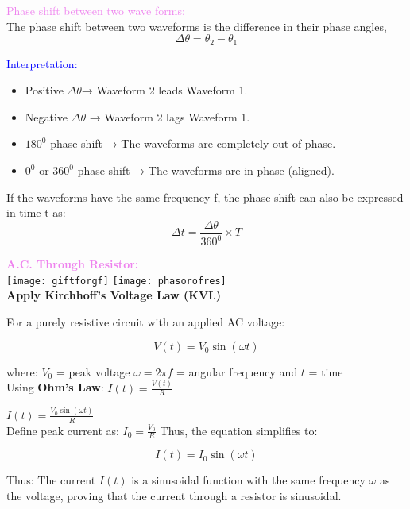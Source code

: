 \documentclass{beamer}
\begin{document}
\begin{frame}
\textcolor{violet}{Phase shift between two wave forms:}\\
The phase shift between two waveforms is the difference in their phase angles, 
\[
\Delta\theta=\theta_2-\theta_1
\]

\textcolor{blue}{Interpretation:}
\begin{itemize}
\item Positive $\Delta\theta$→ Waveform 2 leads Waveform 1.
\item Negative $\Delta\theta$ → Waveform 2 lags Waveform 1.
\item $180^0$ phase shift → The waveforms are completely out of phase.
\item $0^0$ or $360^0$ phase shift → The waveforms are in phase (aligned).
\end{itemize} 
If the waveforms have the same frequency f, the phase shift can also be expressed in time t as:
\[
\Delta t=\frac{\Delta\theta}{360^0}\times T
\]

\end{frame}

\begin{frame}
\textcolor{violet}{\textbf{A.C. Through Resistor:}}\\
\texttt{[image: giftforgf]}
\texttt{[image: phasorofres]}\\
\textbf{Apply Kirchhoff’s Voltage Law (KVL)}


For a purely resistive circuit with an applied AC voltage:

\[
V(t) = V_0 \sin(\omega t)
\]

where: \( V_0 \) = peak voltage  \( \omega = 2\pi f \) = angular frequency  
    and \( t \) = time  \\

Using \textbf{Ohm’s Law}: $I(t) = \frac{V(t)}{R}$

\hspace{6cm} $I(t) = \frac{V_0\sin(\omega t)}{R}$\\
Define peak current as:  $I_0 = \frac{V_0}{R}$
Thus, the equation simplifies to:

\[
I(t) = I_0 \sin(\omega t)
\]

Thus: The current \( I(t) \) is a sinusoidal function with the same frequency \( \omega \) as the voltage, proving that the current through a resistor is sinusoidal.
\end{frame}
\end{document}
